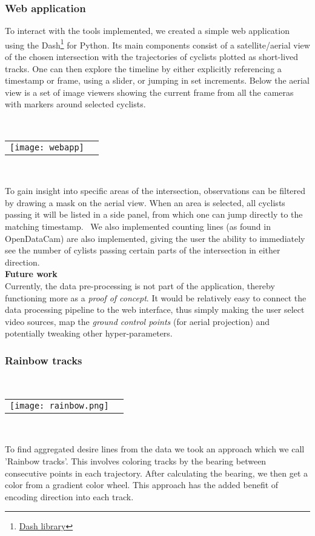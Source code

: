 \subsubsection{Web application}
To interact with the tools implemented, we created a simple web application using the Dash\footnote{\href{https://plotly.com/dash/}{Dash library}} for Python. 
Its main components consist of a satellite/aerial view of the chosen intersection with the trajectories of cyclists plotted as short-lived tracks. 
One can then explore the timeline by either explicitly referencing a timestamp or frame, using a slider, or jumping in set increments.
Below the aerial view is a set of image viewers showing the current frame from all the cameras with markers around selected cyclists.

\ \\ 
\raggedbottom
\begin{tabular}{@{}cc}
\texttt{[image: webapp]} 
\end{tabular}
\label{webapp}
\

To gain insight into specific areas of the intersection, observations can be filtered by drawing a mask on the aerial view. 
When an area is selected, all cyclists passing it will be listed in a side panel, from which one can jump directly to the matching timestamp.
\
We also implemented counting lines (as found in OpenDataCam) are also implemented, giving the user the ability to immediately see the number of 
cylists passing certain parts of the intersection in either direction.
\ \\

\textbf{Future work} \\
Currently, the data pre-processing is not part of the application, thereby functioning more as a \textit{proof of concept}.
It would be relatively easy to connect the data processing pipeline to the web interface, thus simply making the user 
select video sources, map the \textit{ground control points} (for aerial projection) and potentially tweaking other hyper-parameters. 

\subsubsection{Rainbow tracks}

\ \\ 
\noindent
\begin{tabular}{@{}cc}
\texttt{[image: rainbow.png]} 
\end{tabular}
\label{Rainbow}
\

To find aggregated desire lines from the data we took an approach which we call 'Rainbow tracks'. 
This involves coloring tracks by the bearing between consecutive points in each trajectory. 
After calculating the bearing, we then get a color from a gradient color wheel. 
This approach has the added benefit of encoding direction into each track.
\ \\ 


